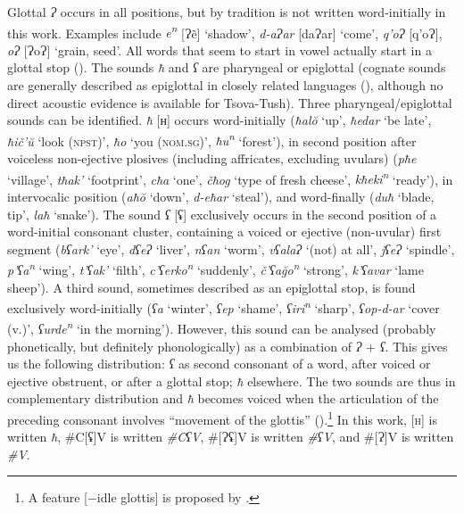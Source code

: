 Glottal \textit{Ɂ} occurs in all positions, but by tradition is not written word-initially in this work. Examples include \textit{e\textsuperscript{n}} [Ɂẽ] `shadow', \textit{d-aɁar} [daɁar] `come', \textit{q'oɁ} [q'oɁ], \textit{oɁ} [ɁoɁ] `grain, seed'. All words that seem to start in vowel actually start in a glottal stop (\cites[]{kojima11pharyng}). The sounds \textit{ħ} and \textit{ʕ} are pharyngeal or epiglottal (cognate sounds are generally described as epiglottal in closely related languages (\cite{nichols00pharyng}), although no direct acoustic evidence is available for Tsova-Tush).
Three pharyngeal/epiglottal sounds can be identified. \textit{ħ} [ʜ] occurs word-initially (\textit{ħal\u{o}} `up', \textit{ħedar} `be late', \textit{ħič'\u{u}} `look (\textsc{npst})', \textit{ħo} `you (\textsc{nom.sg})', \textit{ħu\textsuperscript{n}} `forest'), in second position after voiceless non-ejective plosives (including affricates, excluding uvulars) (\textit{pħe} `village', \textit{tħak'} `footprint', \textit{cħa} `one', \textit{čħog} `type of fresh cheese', \textit{kħeki\textsuperscript{n}} `ready'), in intervocalic position (\textit{aħ\u{o}} `down', \textit{d-eħar} `steal'), and word-finally (\textit{duħ} `blade, tip', \textit{laħ} `snake'). The sound \textit{ʕ} [ʢ] exclusively occurs in the second position of a word-initial consonant cluster, containing a voiced or ejective (non-uvular) first segment (\textit{bʕark'} `eye', \textit{dʕeɁ} `liver', \textit{nʕan} `worm', \textit{vʕalaɁ} `(not) at all', \textit{jʕeɁ} `spindle', \textit{p'ʕa\textsuperscript{n}} `wing', \textit{t'ʕak'} `filth', \textit{c'ʕerko\textsuperscript{n}} `suddenly', \textit{č'ʕa\u{g}o\textsuperscript{n}} `strong', \textit{k'ʕavar} `lame sheep'). A third sound, sometimes described as an epiglottal stop, is found exclusively word-initially (\textit{ʕa} `winter', \textit{ʕep} `shame', \textit{ʕiri\textsuperscript{n}} `sharp', \textit{ʕop-d-ar} `cover (v.)', \textit{ʕurde\textsuperscript{n}} `in the morning'). However, this sound can be analysed (probably phonetically, but definitely phonologically) as a combination of \textit{Ɂ} + \textit{ʕ}. This gives us the following distribution: \textit{ʕ} as second consonant of a word, after voiced or ejective obstruent, or after a glottal stop; \textit{ħ} elsewhere. The two sounds are thus in complementary distribution and \textit{ħ} becomes voiced when the articulation of the preceding consonant involves ``movement of the glottis'' (\cite{kojima11pharyng}).\footnote{A feature [−idle glottis] is proposed by \textcite{faustetal2025ttidleglottis}.} In this work, [\textsc{h}] is written \textit{ħ}, \#C[ʢ]V is written \textit{\#CʕV}, \#[Ɂʢ]V is written \textit{\#ʕV}, and \#[Ɂ]V is written \textit{\#V}.


